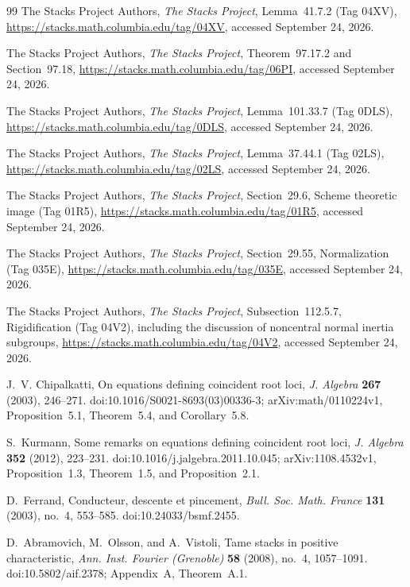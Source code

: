 \documentclass[11pt,reqno]{amsart}
\numberwithin{equation}{section}
\theoremstyle{definition}\newtheorem{definition}[theorem]{Definition}
\theoremstyle{remark}\newtheorem{remark}[theorem]{Remark}
\begin{document}
\begin{thebibliography}{99}
The Stacks Project Authors, \emph{The Stacks Project},
Lemma~41.7.2 (Tag 04XV),
\url{https://stacks.math.columbia.edu/tag/04XV}, accessed September 24, 2026.

The Stacks Project Authors, \emph{The Stacks Project},
Theorem~97.17.2 and Section~97.18,
\url{https://stacks.math.columbia.edu/tag/06PI}, accessed September 24, 2026.

The Stacks Project Authors, \emph{The Stacks Project},
Lemma~101.33.7 (Tag 0DLS),
\url{https://stacks.math.columbia.edu/tag/0DLS}, accessed September 24, 2026.

The Stacks Project Authors, \emph{The Stacks Project},
Lemma~37.44.1 (Tag 02LS),
\url{https://stacks.math.columbia.edu/tag/02LS}, accessed September 24, 2026.

The Stacks Project Authors, \emph{The Stacks Project},
Section~29.6, Scheme theoretic image (Tag 01R5),
\url{https://stacks.math.columbia.edu/tag/01R5}, accessed September 24, 2026.

The Stacks Project Authors, \emph{The Stacks Project},
Section~29.55, Normalization (Tag 035E),
\url{https://stacks.math.columbia.edu/tag/035E}, accessed September 24, 2026.

The Stacks Project Authors, \emph{The Stacks Project},
Subsection~112.5.7, Rigidification (Tag 04V2), including the discussion
of noncentral normal inertia subgroups,
\url{https://stacks.math.columbia.edu/tag/04V2}, accessed September 24, 2026.


J.~V. Chipalkatti, On equations defining coincident root loci,
\emph{J. Algebra} \textbf{267} (2003), 246--271.
doi:10.1016/S0021-8693(03)00336-3;
arXiv:math/0110224v1, Proposition~5.1, Theorem~5.4,
and Corollary~5.8.

S.~Kurmann, Some remarks on equations defining coincident root loci,
\emph{J. Algebra} \textbf{352} (2012), 223--231.
doi:10.1016/j.jalgebra.2011.10.045;
arXiv:1108.4532v1, Proposition~1.3, Theorem~1.5,
and Proposition~2.1.

D.~Ferrand, Conducteur, descente et pincement,
\emph{Bull. Soc. Math. France} \textbf{131} (2003), no.~4, 553--585.
doi:10.24033/bsmf.2455.

D.~Abramovich, M.~Olsson, and A.~Vistoli, Tame stacks in positive
characteristic, \emph{Ann. Inst. Fourier (Grenoble)}
\textbf{58} (2008), no.~4, 1057--1091.
doi:10.5802/aif.2378; Appendix~A, Theorem~A.1.


\end{thebibliography}
\end{document}
